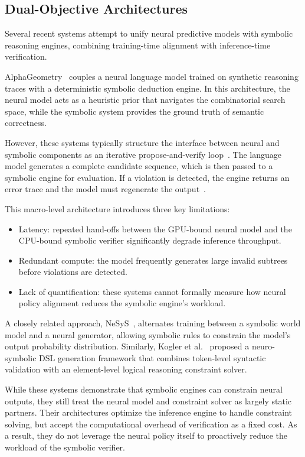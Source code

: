   \subsection{Dual-Objective Architectures}
  Several recent systems attempt to unify neural predictive models with symbolic
  reasoning engines, combining training-time alignment with inference-time
  verification.

  AlphaGeometry~\cite{trinh2024solving} couples a neural language model trained on synthetic
  reasoning traces with a deterministic symbolic deduction engine. In this
  architecture, the neural model acts as a heuristic prior that navigates the
  combinatorial search space, while the symbolic system provides the ground truth
  of semantic correctness.

  However, these systems typically structure the interface between neural and
  symbolic components as an iterative propose-and-verify loop~\cite{jiang2022draft}. The language model
  generates a complete candidate sequence, which is then passed to a symbolic
  engine for evaluation. If a violation is detected, the engine returns an error
  trace and the model must regenerate the output~\cite{jiang2022draft}.

  This macro-level architecture introduces three key limitations:
  \begin{itemize}
  \item Latency: repeated hand-offs between the GPU-bound neural model and the
  CPU-bound symbolic verifier significantly degrade inference throughput.
  \item Redundant compute: the model frequently generates large invalid subtrees
  before violations are detected.
  \item Lack of quantification: these systems cannot formally measure how neural
  policy alignment reduces the symbolic engine's workload.
  \end{itemize}

  A closely related approach, NeSyS~\cite{zhao2026neuro}, alternates training between a
  symbolic world model and a neural generator, allowing symbolic rules to
  constrain the model's output probability distribution. Similarly, Kogler
  et al.~\cite{kogler2026towards} proposed a neuro-symbolic DSL generation framework that combines
  token-level syntactic validation with an element-level logical reasoning
  constraint solver.

  While these systems demonstrate that symbolic engines can constrain neural
  outputs, they still treat the neural model and constraint solver as largely
  static partners. Their architectures optimize the inference engine to handle
  constraint solving, but accept the computational overhead of verification as a
  fixed cost. As a result, they do not leverage the neural policy itself to
  proactively reduce the workload of the symbolic verifier.